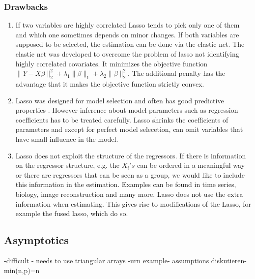 \documentclass{article}
\theoremstyle{definition}
\begin{document}



\subsubsection{Drawbacks}
\begin{enumerate}
	\item If two variables are highly correlated Lasso tends to pick only one of them and which one sometimes depends on minor changes.  If both variables are supposed to be selected, the estimation can be done via the elastic net. The elastic net was developed to overcome the problem of lasso not identifying highly correlated covariates. It minimizes the objective function $\| Y-X\beta\|_2^2+\lambda_1 \| \beta\|_1 +\lambda_2\|\beta\|_2^2$. The additional penalty has the advantage that it makes the objective function strictly convex.
	\item Lasso was designed for model selection and often has good predictive properties \citep{belloni2014}. However inference about model parameters such as regression coefficients has to be treated carefully. Lasso shrinks the coefficients of parameters and except for perfect model selecetion, can omit variables that have small influence in the model.
	\item Lasso does not exploit the structure of the regressors. If there is information on the regressor structure, e.g. the $X_i's$ can be ordered in a meaningful way or there are regressors that can be seen as a group, we would like to include this information in the estimation. Examples can be found in time series, biology, image reconstruction and many more.
	Lasso does not use the extra information when estimating. This gives rise to modifications of the Lasso, for example the fused lasso, which do so. 
\end{enumerate}


\subsection{Asymptotics}
\label{sec:asymptoticslasso}
-difficult - needs to use triangular arrays -urn example- assumptions diskutieren-min(n,p)=n
\bigskip
\end{document}
